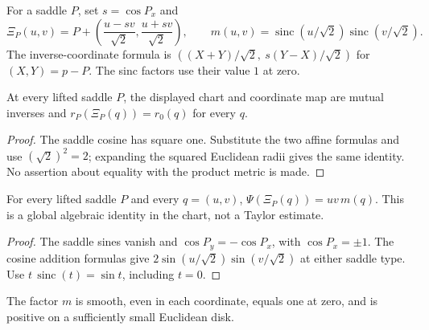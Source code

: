 \begin{definition}
\label{def:saddle-ortho-chart}
\leanok
For a saddle $P$, set $s=\cos P_x$ and
\[
 \Xi_P(u,v)=P+\left(\frac{u-sv}{\sqrt2},\frac{u+sv}{\sqrt2}\right),\qquad
 m(u,v)=\operatorname{sinc}(u/\sqrt2)\operatorname{sinc}(v/\sqrt2).
\]
The inverse-coordinate formula is
$((X+Y)/\sqrt2,\ s(Y-X)/\sqrt2)$ for $(X,Y)=p-P$.
The sinc factors use their value $1$ at zero.
\end{definition}

\begin{lemma}
\label{lem:saddle-chart-orthogonal}
\leanok
At every lifted saddle $P$, the displayed chart and coordinate map are
mutual inverses and $r_P(\Xi_P(q))=r_0(q)$ for every $q$.
\end{lemma}

\begin{proof}
\leanok
The saddle cosine has square one. Substitute the two affine formulas
and use $(\sqrt2)^2=2$; expanding the squared Euclidean radii gives the
same identity. No assertion about equality with the product metric is made.
\end{proof}

\begin{lemma}
\label{lem:saddle-dipole-factorization}
\leanok
For every lifted saddle $P$ and every $q=(u,v)$,
$\Psi(\Xi_P(q))=uv\,m(q)$.
This is a global algebraic identity in the chart, not a Taylor estimate.
\end{lemma}

\begin{proof}
\leanok
The saddle sines vanish and $\cos P_y=-\cos P_x$, with $\cos P_x=\pm1$.
The cosine addition formulas give
$2\sin(u/\sqrt2)\sin(v/\sqrt2)$ at either saddle type.
Use $t\,\operatorname{sinc}(t)=\sin t$, including $t=0$.
\end{proof}

\begin{lemma}
\label{lem:saddle-factor-regular}
\leanok
The factor $m$ is smooth, even in each coordinate, equals one at zero,
and is positive on a sufficiently small Euclidean disk.
\end{lemma}

